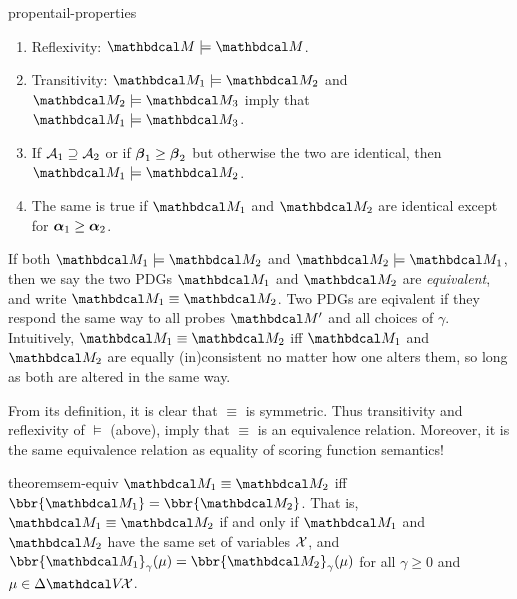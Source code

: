     \begin{linked}{prop}{entail-properties}
        \begin{enumerate}[parsep=0pt,topsep=0pt]
            \item Reflexivity: $\dg M \models \dg M$.
            \item Transitivity: $\dg M_1 \models \dg M_2$ and $\dg M_2 \models \dg M_3$ imply that $\dg M_1 \models \dg M_3$. 
            \item If 
                $\mathcal A_1 \supseteq \mathcal A_2$
                 or if $\boldsymbol\beta_1 \ge \boldsymbol\beta_2$ but otherwise the two are identical, then $\dg M_1 \models \dg M_2$. 
            \item The same is true if $\dg M_1$ and $\dg M_2$ are identical except for
            $\boldsymbol\alpha_1 \ge \boldsymbol\alpha_2$.%
        \end{enumerate}
    \end{linked}
    
    
    If both $\dg M_1 \models \dg M_2$ and $\dg M_2 \models \dg M_1$, 
        then we say the two PDGs $\dg M_1$ and $\dg M_2$ are \emph{equivalent}, and write $\dg M_1 \equiv \dg M_2$.
    Two PDGs are eqivalent if they respond the same way to all probes $\dg M'$ and all choices of $\gamma$.
    Intuitively, $\dg M_1 \equiv \dg M_2$ iff $\dg M_1$ and $\dg M_2$ are equally (in)consistent no matter how one alters them, so long as both are altered in the same way. 
    

From its definition, it is clear that $\equiv$ is symmetric.
Thus transitivity and reflexivity of $\models$ (above), imply that
$\equiv$ is an equivalence relation. Moreover, it is the same equivalence relation as equality of scoring function semantics!

\begin{linked}{theorem}{sem-equiv}
    $\dg M_1 \equiv \dg M_2$ iff $\bbr{\dg M_1} = \bbr{\dg M_2}$.
    That is, $\dg M_1 \equiv \dg M_2$ if and only if 
    $\dg M_1$ and $\dg M_2$ have the same set of variables $\mathcal X$, and
    $\bbr{\dg M_1}_\gamma(\mu) = \bbr{\dg M_2}_\gamma(\mu)$
    for all $\gamma \ge 0$ and $\mu \in \Delta\V\!\X$.
\end{linked}    


